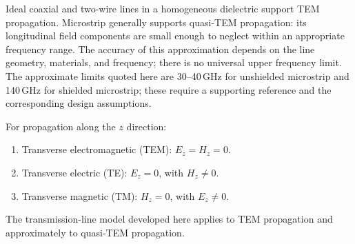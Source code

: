 \documentclass{ximera}
\begin{document}
Ideal coaxial and two-wire lines in a homogeneous dielectric
support TEM propagation. Microstrip generally supports
quasi-TEM propagation: its longitudinal field components
are small enough to neglect within an appropriate frequency
range. The accuracy of this approximation depends on the
line geometry, materials, and frequency; there is no universal
upper frequency limit. The approximate limits quoted here
are 30--40\,GHz for unshielded microstrip and 140\,GHz for
shielded microstrip; these require a supporting reference
and the corresponding design assumptions.

For propagation along the $z$ direction:
\begin{enumerate}
\item Transverse electromagnetic (TEM): $E_z=H_z=0$.
\item Transverse electric (TE): $E_z=0$, with $H_z\ne0$.
\item Transverse magnetic (TM): $H_z=0$, with $E_z\ne0$.
\end{enumerate}

The transmission-line model developed here applies to TEM
propagation and approximately to quasi-TEM propagation.

\end{document}
